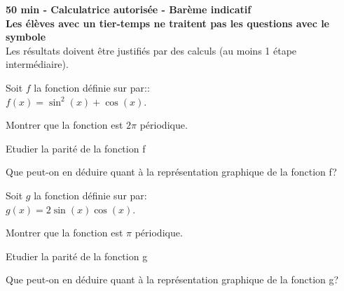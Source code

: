 \documentclass[12pt,a4paper]{article}  %
\begin{document}
\graphicspath{{../images/}}

\begin{center}

\end{center}


\begin{center}\textbf{50 min - Calculatrice autorisée - Barème indicatif}\\
\textbf{Les élèves avec un tier-temps ne traitent pas les questions avec  le symbole }\\
Les résultats doivent être justifiés par des calculs (au moins 1 étape intermédiaire).
\end{center}

%
\vspace{-.3cm} 
\begin{minipage}[c]{0.48\linewidth}
	Soit $f$ la fonction définie sur \R par::\\
	$f(x)=\sin^2(x)+\cos(x)$.
	\begin{enumMet}
		\item Montrer que la fonction est $2\pi$ périodique.
		\item Etudier la parité de la fonction f
		\item Que peut-on en déduire quant à la représentation graphique de la fonction f?
	\end{enumMet}
\end{minipage} \hfill
\begin{minipage}[c]{0.48\linewidth}
	Soit $g$ la fonction définie sur \R par:\\
	$g(x)=2\sin(x)\cos(x)$.
	\begin{enumMet}
		\item {} Montrer que la fonction est $\pi$ périodique.
		\item {} Etudier la parité de la fonction g
		\item {} Que peut-on en déduire quant à la représentation graphique de la fonction g?
	\end{enumMet}
\end{minipage}
\end{document}
